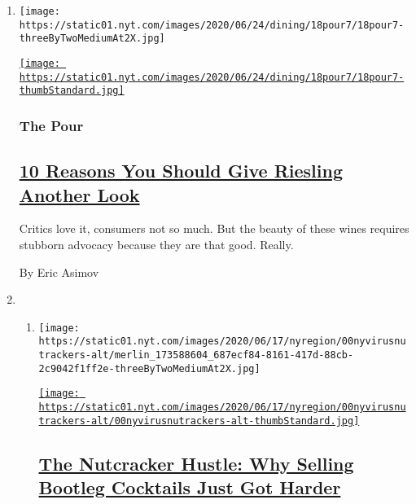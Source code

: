 \begin{enumerate}
\def\labelenumi{\arabic{enumi}.}
\item
  \texttt{[image: https://static01.nyt.com/images/2020/06/24/dining/18pour7/18pour7-threeByTwoMediumAt2X.jpg]}

  \href{/2020/06/18/dining/drinks/dry-riesling.html}{\texttt{[image: https://static01.nyt.com/images/2020/06/24/dining/18pour7/18pour7-thumbStandard.jpg]}}

  \hypertarget{the-pour}{%
  \subsubsection{The Pour}\label{the-pour}}

  \hypertarget{10-reasons-you-should-give-riesling-another-look}{%
  \subsection{\texorpdfstring{\href{/2020/06/18/dining/drinks/dry-riesling.html}{10
  Reasons You Should Give Riesling Another
  Look}}{10 Reasons You Should Give Riesling Another Look}}\label{10-reasons-you-should-give-riesling-another-look}}

  Critics love it, consumers not so much. But the beauty of these wines
  requires stubborn advocacy because they are that good. Really.

  By Eric Asimov
\item
  \begin{enumerate}
  \def\labelenumii{\arabic{enumii}.}
  \item
    \texttt{[image: https://static01.nyt.com/images/2020/06/17/nyregion/00nyvirusnutrackers-alt/merlin\_173588604\_687ecf84-8161-417d-88cb-2c9042f1ff2e-threeByTwoMediumAt2X.jpg]}

    \href{/2020/06/20/nyregion/coronavirus-nutcrackers-cocktails-nyc.html}{\texttt{[image: https://static01.nyt.com/images/2020/06/17/nyregion/00nyvirusnutrackers-alt/00nyvirusnutrackers-alt-thumbStandard.jpg]}}

    \hypertarget{the-nutcracker-hustle-why-selling-bootleg-cocktails-just-got-harder}{%
    \subsection{\texorpdfstring{\href{/2020/06/20/nyregion/coronavirus-nutcrackers-cocktails-nyc.html}{The
    Nutcracker Hustle: Why Selling Bootleg Cocktails Just Got
    Harder}}{The Nutcracker Hustle: Why Selling Bootleg Cocktails Just Got Harder}}\label{the-nutcracker-hustle-why-selling-bootleg-cocktails-just-got-harder}}


\end{enumerate}
\end{enumerate}
